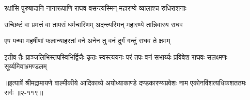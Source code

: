 \twolineshloka
{रक्षांसि पुरुषादानि नानारूपाणि राघव}
{वसन्त्यस्मिन् महारण्ये व्यालाश्च रुधिराशनाः} %

\twolineshloka
{उच्छिष्टं वा प्रमत्तं वा तापसं धर्मचारिणम्}
{अदन्त्यस्मिन् महारण्ये तान्निवारय राघव} %

\twolineshloka
{एष पन्था महर्षीणां फलान्याहरतां वने}
{अनेन तु वनं दुर्गं गन्तुं राघव ते क्षमम्} %

\twolineshloka
{इतीव तैः प्राञ्जलिभिस्तपस्विभिर्द्विजैः कृतः स्वस्त्ययनः परं तपः}
{वनं सभार्य्यः प्रविऺवेश राघवः सलक्ष्मणः सूर्य्यमिवाभ्रमण्डलम्} %


॥इत्यार्षे श्रीमद्रामायणे वाल्मीकीये आदिकाव्ये अयोध्याकाण्डे दण्डकारण्यप्रवेशः नाम एकोनविंशत्यधिकशततमः सर्गः ॥२-११९॥

